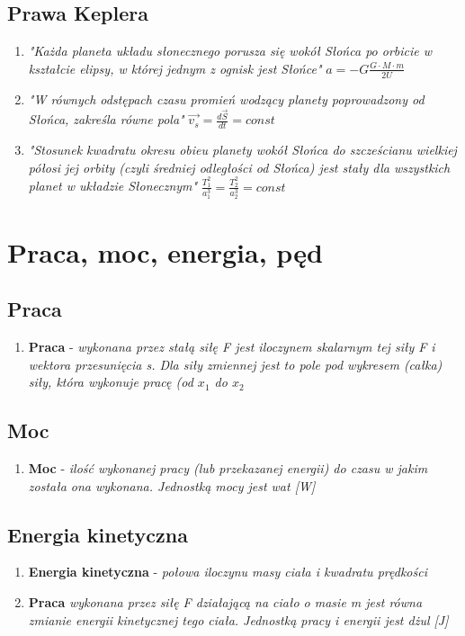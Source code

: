 \documentclass[12pt,twoside,a4paper]{book}
\begin{document}
\section{Prawa Keplera}
\begin{enumerate}[label=(\Roman*)]
\item\textit{"Każda planeta układu słonecznego porusza się wokół Słońca po orbicie w kształcie elipsy, w której jednym z ognisk jest Słońce"} $a = -G \frac{G \cdot M \cdot m}{2U}$
\item\textit{"W równych odstępach czasu promień wodzący planety poprowadzony od Słońca, zakreśla równe pola"} $\overrightarrow{v_s} = \frac{d \overrightarrow{S}}{dt} = const$
\item\textit{"Stosunek kwadratu okresu obieu planety wokół Słońca do szcześcianu wielkiej półosi jej orbity (czyli średniej odległości od Słońca) jest stały dla wszystkich planet w układzie Słonecznym"} $\frac{T_1^2}{a_1^3} = \frac{T_2^2}{a_2^3} = const$
\end{enumerate}

\chapter{Praca, moc, energia, pęd}
\section{Praca}
\begin{enumerate}[label=(\alph*)]
\item\textbf{Praca} - \textit{wykonana przez stałą siłę F jest iloczynem skalarnym tej siły F i wektora
przesunięcia s. Dla siły zmiennej jest to pole pod wykresem (całka) siły, która wykonuje pracę (od $x_1$ do $x_2$}
\end{enumerate}

\section{Moc}
\begin{enumerate}[label=(\alph*)]
\item\textbf{Moc} - \textit{ilość wykonanej pracy (lub przekazanej energii) do czasu w jakim została ona wykonana. Jednostką mocy jest wat [W]}
\end{enumerate}

\section{Energia kinetyczna}
\begin{enumerate}[label=(\alph*)]
\item\textbf{Energia kinetyczna} - \textit{połowa iloczynu masy ciała i kwadratu prędkości}
\item\textbf{Praca} \textit{wykonana przez siłę F działającą na ciało o masie m jest równa zmianie
energii kinetycznej tego ciała. Jednostką pracy i energii jest dżul [J]}
\end{enumerate}
\end{document}
